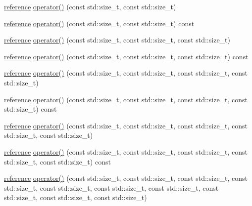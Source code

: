 \begin{DoxyCompactItemize}
\item 
\hyperlink{classandres_1_1View_aebdd1f19272b743b4422ff8ba18fc11a}{reference} \hyperlink{classandres_1_1View_a216831a61d22edc3b74cf09df8e537f3}{operator()} (const std\+::size\+\_\+t, const std\+::size\+\_\+t)
\item 
\hyperlink{classandres_1_1View_aebdd1f19272b743b4422ff8ba18fc11a}{reference} \hyperlink{classandres_1_1View_a08a9d2bb8fd2cb210ef328d5ce9e2e3d}{operator()} (const std\+::size\+\_\+t, const std\+::size\+\_\+t) const
\item 
\hyperlink{classandres_1_1View_aebdd1f19272b743b4422ff8ba18fc11a}{reference} \hyperlink{classandres_1_1View_a46b12868d2aa22f89f65d604885dc1eb}{operator()} (const std\+::size\+\_\+t, const std\+::size\+\_\+t, const std\+::size\+\_\+t)
\item 
\hyperlink{classandres_1_1View_aebdd1f19272b743b4422ff8ba18fc11a}{reference} \hyperlink{classandres_1_1View_a8c3cff5cefe9917e379a0cc3c015c9a8}{operator()} (const std\+::size\+\_\+t, const std\+::size\+\_\+t, const std\+::size\+\_\+t) const
\item 
\hyperlink{classandres_1_1View_aebdd1f19272b743b4422ff8ba18fc11a}{reference} \hyperlink{classandres_1_1View_acd5927bb3d8203e4811c6f17872b1c84}{operator()} (const std\+::size\+\_\+t, const std\+::size\+\_\+t, const std\+::size\+\_\+t, const std\+::size\+\_\+t)
\item 
\hyperlink{classandres_1_1View_aebdd1f19272b743b4422ff8ba18fc11a}{reference} \hyperlink{classandres_1_1View_a64656e858aed3831c789525dca8f242b}{operator()} (const std\+::size\+\_\+t, const std\+::size\+\_\+t, const std\+::size\+\_\+t, const std\+::size\+\_\+t) const
\item 
\hyperlink{classandres_1_1View_aebdd1f19272b743b4422ff8ba18fc11a}{reference} \hyperlink{classandres_1_1View_aee5664db40d9e07abe0dd57262b5191e}{operator()} (const std\+::size\+\_\+t, const std\+::size\+\_\+t, const std\+::size\+\_\+t, const std\+::size\+\_\+t, const std\+::size\+\_\+t)
\item 
\hyperlink{classandres_1_1View_aebdd1f19272b743b4422ff8ba18fc11a}{reference} \hyperlink{classandres_1_1View_a84cc90482929b4db64fee16faa38d65d}{operator()} (const std\+::size\+\_\+t, const std\+::size\+\_\+t, const std\+::size\+\_\+t, const std\+::size\+\_\+t, const std\+::size\+\_\+t) const
\item 
\hyperlink{classandres_1_1View_aebdd1f19272b743b4422ff8ba18fc11a}{reference} \hyperlink{classandres_1_1View_a2be86ccd328fc276f37686fb1872cb9c}{operator()} (const std\+::size\+\_\+t, const std\+::size\+\_\+t, const std\+::size\+\_\+t, const std\+::size\+\_\+t, const std\+::size\+\_\+t, const std\+::size\+\_\+t, const std\+::size\+\_\+t, const std\+::size\+\_\+t, const std\+::size\+\_\+t, const std\+::size\+\_\+t)

\end{DoxyCompactItemize}
